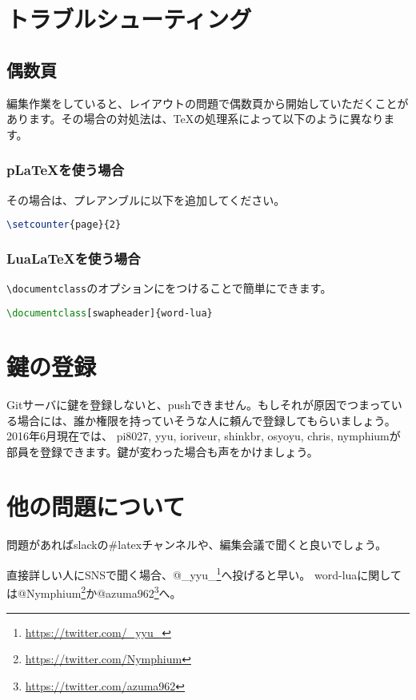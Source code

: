 \section{トラブルシューティング}

\subsection{偶数頁}

編集作業をしていると、レイアウトの問題で偶数頁から開始していただくことがあります。その場合の対処法は、\TeX の処理系によって以下のように異なります。

\subsubsection{p\LaTeX を使う場合}

その場合は、プレアンブルに以下を追加してください。

\begin{lstlisting}[language=TeX, mathescape]
\setcounter{page}{2}
\end{lstlisting}

\subsubsection{Lua\LaTeX を使う場合}

\lstinline|\documentclass|のオプションにをつけることで簡単にできます。

\begin{lstlisting}[language=TeX, mathescape]
\documentclass[swapheader]{word-lua}
\end{lstlisting}

\section{鍵の登録}

Gitサーバに鍵を登録しないと、pushできません。もしそれが原因でつまっている場合には、誰か権限を持っていそうな人に頼んで登録してもらいましょう。2016年6月現在では、
pi8027, yyu, ioriveur, shinkbr, osyoyu, chris, nymphiumが部員を登録できます。鍵が変わった場合も声をかけましょう。

\section{他の問題について}

問題があればslackの\#latexチャンネルや、編集会議で聞くと良いでしょう。

直接詳しい人にSNSで聞く場合、@\_yyu\_\footnote{\url{https://twitter.com/_yyu_}}へ投げると早い。
word-luaに関しては@Nymphium\footnote{\url{https://twitter.com/Nymphium}}か@azuma962\footnote{\url{https://twitter.com/azuma962}}へ。



